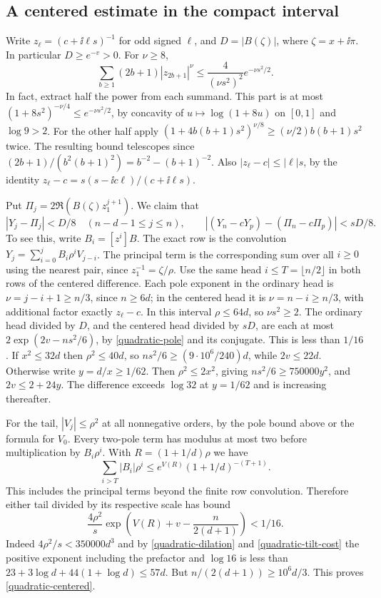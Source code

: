 \subsection{A centered estimate in the compact interval}
Write \(z_\ell=(c+\ii\ell s)^{-1}\) for odd signed \(\ell\), and
\(D=|B(\zeta)|\), where \(\zeta=x+\ii\pi\). In particular
\(D\ge e^{-v}>0\). For \(\nu\ge8\),
\begin{equation}\label{quadratic-pole}
 \sum_{b\ge1}(2b+1)|z_{2b+1}|^\nu
 \le\frac{4}{(\nu s^2)^2}e^{-\nu s^2/2}.
\end{equation}
In fact, extract half the power from each summand. This part is at most
\((1+8s^2)^{-\nu/4}\le e^{-\nu s^2/2}\), by concavity of
\(u\mapsto\log(1+8u)\) on \([0,1]\) and \(\log9>2\).
For the other half apply
\((1+4b(b+1)s^2)^{\nu/8}\ge(\nu/2)b(b+1)s^2\) twice.
The resulting bound telescopes since
\((2b+1)/(b^2(b+1)^2)=b^{-2}-(b+1)^{-2}\).
Also \(|z_\ell-c|\le|\ell|s\), by the identity
\(z_\ell-c=s(s-\ii c\ell)/(c+\ii\ell s)\).

Put \(\Pi_j=2\Re(B(\zeta)z_1^{j+1})\).
We claim that
\begin{equation}\label{quadratic-centered}
 |Y_j-\Pi_j|< D/8\quad(n-d-1\le j\le n),\qquad
 |(Y_n-cY_p)-(\Pi_n-c\Pi_p)|<sD/8.
\end{equation}
To see this, write \(B_i=[z^i]B\).
The exact row is the convolution \(Y_j=\sum_{i=0}^{j}B_i\rho^i V_{j-i}\).
The principal term is the corresponding sum over all \(i\ge0\)
using the nearest pair, since \(z_1^{-1}=\zeta/\rho\).
Use the same head \(i\le T=\lfloor n/2\rfloor\) in both rows of the
centered difference. Each pole exponent in the ordinary head is
\(\nu=j-i+1\ge n/3\), since \(n\ge6d\); in the centered head it is \(\nu=n-i\ge n/3\),
with additional factor exactly \(z_\ell-c\).
In this interval \(\rho\le64d\), so \(\nu s^2\ge2\).
The ordinary head divided by \(D\), and the centered head divided by
\(sD\), are each at most \(2\exp(2v-ns^2/6)\), by
\eqref{quadratic-pole} and its conjugate. This is less than \(1/16\).
If \(x^2\le32d\) then \(\rho^2\le40d\), so
\(ns^2/6\ge (9\cdot10^6/240)d\), while \(2v\le22d\).
Otherwise write \(y=d/x\ge1/62\).
Then \(\rho^2\le2x^2\), giving \(ns^2/6\ge750000y^2\), and
\(2v\le2+24y\). The difference exceeds \(\log32\) at \(y=1/62\)
and is increasing thereafter.

For the tail, \(|V_j|\le\rho^2\) at all nonnegative orders, by the
pole bound above or the formula for \(V_0\). Every two-pole term
has modulus at most two before multiplication by \(B_i\rho^i\).
With \(R=(1+1/d)\rho\) we have
\[
 \sum_{i>T}|B_i|\rho^i\le e^{V(R)}(1+1/d)^{-(T+1)}.
\]
This includes the principal terms beyond the finite row convolution.
Therefore either tail divided by its respective scale has bound
\[
 \frac{4\rho^2}{s}\exp\!\left(V(R)+v-\frac{n}{2(d+1)}\right)<1/16.
\]
Indeed \(4\rho^2/s<350000 d^3\) and by \eqref{quadratic-dilation}
and \eqref{quadratic-tilt-cost} the positive exponent including the
prefactor and \(\log16\) is less than
\(23+3\log d+44(1+\log d)\le57d\).
But \(n/(2(d+1))\ge10^6d/3\).
This proves \eqref{quadratic-centered}.

